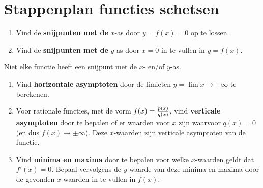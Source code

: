 \documentclass[
  a4paper,
]{scrbook}
\providecommand{\tightlist}{%
  \setlength{\itemsep}{0pt}\setlength{\parskip}{0pt}}\usepackage{longtable,booktabs,array}
\theoremstyle{definition}
\theoremstyle{remark}
\begin{document}
\hypertarget{stappenplan-functies-schetsen}{%
\section{Stappenplan functies
schetsen}\label{stappenplan-functies-schetsen}}

\begin{enumerate}
\def\labelenumi{\arabic{enumi}.}
\tightlist
\item
  Vind de \textbf{snijpunten met de} \(x\)-as door \(y = f(x) = 0\) op
  te lossen.
\item
  Vind de \textbf{snijpunten met de} \(y\)-as door \(x=0\) in te vullen
  in \(y = f(x)\).
\end{enumerate}

\begin{tcolorbox}[enhanced jigsaw, coltitle=black, breakable, bottomtitle=1mm, opacityback=0, colback=white, rightrule=.15mm, title=\textcolor{quarto-callout-tip-color}{\faLightbulb}\hspace{0.5em}{Tip}, bottomrule=.15mm, toprule=.15mm, left=2mm, colframe=quarto-callout-tip-color-frame, toptitle=1mm, opacitybacktitle=0.6, titlerule=0mm, colbacktitle=quarto-callout-tip-color!10!white, leftrule=.75mm, arc=.35mm]

Niet elke functie heeft een snijpunt met de \(x\)- en/of \(y\)-as.

\end{tcolorbox}

\begin{enumerate}
\def\labelenumi{\arabic{enumi}.}
\setcounter{enumi}{2}
\tightlist
\item
  Vind \textbf{horizontale asymptoten} door de limieten
  \(y = \lim x \to \pm \infty\) te berekenen.
\item
  Voor rationale functies, met de vorm \(f(x) = {p(x) \over q(x)}\),
  vind \textbf{verticale asymptoten} door te bepalen of er waarden voor
  \(x\) zijn waarvoor \(q(x)=0\) (en dus \(f(x) \to \pm \infty\)). Deze
  \(x\)-waarden zijn verticale asymptoten van de functie.
\item
  Vind \textbf{minima en maxima} door te bepalen voor welke
  \(x\)-waarden geldt dat \(f'(x)=0\). Bepaal vervolgens de \(y\)-waarde
  van deze minima en maxima door de gevonden \(x\)-waarden in te vullen
  in \(f(x)\).
\end{enumerate}
\end{document}
